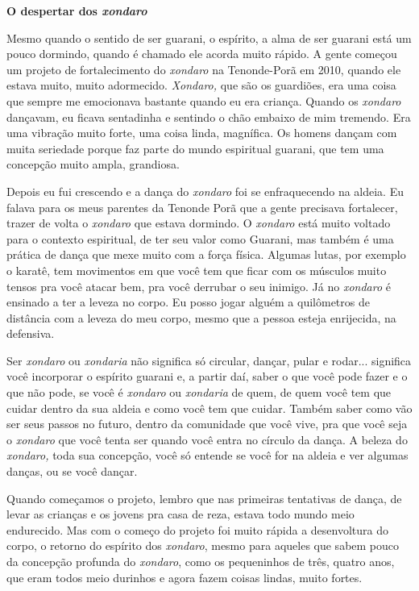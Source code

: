 \textbf{O despertar dos \emph{xondaro}}

Mesmo quando o sentido de ser guarani, o espírito, a alma de ser guarani
está um pouco dormindo, quando é chamado ele acorda muito rápido. A
gente começou um projeto de fortalecimento do \emph{xondaro} na
Tenonde-Porã em 2010, quando ele estava muito, muito adormecido.
\emph{Xondaro,} que são os guardiões, era uma coisa que sempre me
emocionava bastante quando eu era criança. Quando os \emph{xondaro}
dançavam, eu ficava sentadinha e sentindo o chão embaixo de mim
tremendo. Era uma vibração muito forte, uma coisa linda, magnífica. Os
homens dançam com muita seriedade porque faz parte do mundo espiritual
guarani, que tem uma concepção muito ampla, grandiosa.

Depois eu fui crescendo e a dança do \emph{xondaro} foi se enfraquecendo
na aldeia. Eu falava para os meus parentes da Tenonde Porã que a gente
precisava fortalecer, trazer de volta o \emph{xondaro} que estava
dormindo. O \emph{xondaro} está muito voltado para o contexto
espiritual, de ter seu valor como Guarani, mas também é uma prática de
dança que mexe muito com a força física. Algumas lutas, por exemplo o
karatê, tem movimentos em que você tem que ficar com os músculos muito
tensos pra você atacar bem, pra você derrubar o seu inimigo. Já no
\emph{xondaro} é ensinado a ter a leveza no corpo. Eu posso jogar alguém
a quilômetros de distância com a leveza do meu corpo, mesmo que a pessoa
esteja enrijecida, na defensiva.

Ser \emph{xondaro} ou \emph{xondaria} não significa só circular, dançar,
pular e rodar... significa você incorporar o espírito guarani e, a
partir daí, saber o que você pode fazer e o que não pode, se você é
\emph{xondaro} ou \emph{xondaria} de quem, de quem você tem que cuidar
dentro da sua aldeia e como você tem que cuidar. Também saber como vão
ser seus passos no futuro, dentro da comunidade que você vive, pra que
você seja o \emph{xondaro} que você tenta ser quando você entra no
círculo da dança. A beleza do \emph{xondaro,} toda sua concepção, você
só entende se você for na aldeia e ver algumas danças, ou se você
dançar.

Quando começamos o projeto, lembro que nas primeiras tentativas de
dança, de levar as crianças e os jovens pra casa de reza, estava todo
mundo meio endurecido. Mas com o começo do projeto foi muito rápida a
desenvoltura do corpo, o retorno do espírito dos \emph{xondaro}, mesmo
para aqueles que sabem pouco da concepção profunda do \emph{xondaro},
como os pequeninhos de três, quatro anos, que eram todos meio durinhos e
agora fazem coisas lindas, muito fortes.

